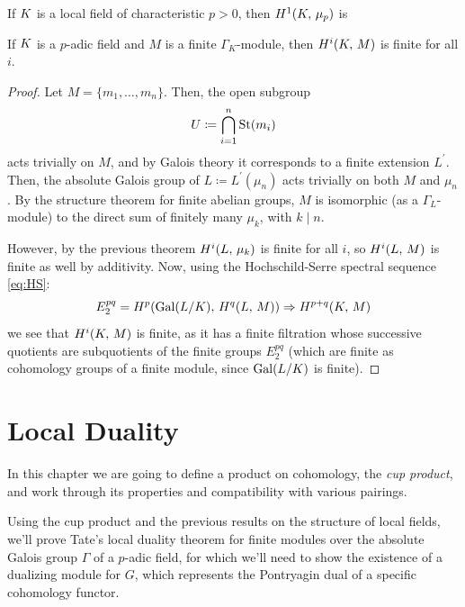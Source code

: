\documentclass[a4paper, oneside]{memoir}
\begin{document}
\begin{remark}\label{rm:H1CharP}
    If $K$ is a local field of characteristic $p>0$, then $H^{1}( K, \, \mu_p )$ is
\end{remark}

\begin{corollary}\label{cor:FinCohom}
    If $K$ is a $p$-adic field and $M$ is a finite $\Gamma_K$-module, then
    \(H^{i}( K, \, M )\) is finite for all $i$.
\end{corollary}
\begin{proof}
    Let $M=\{m_1,\ldots,m_n\}$. Then, the open subgroup
    \[
        U\coloneqq \bigcap_{i=1}^n{\operatorname{\mathrm{St}}(m_i)}
    \]
    acts trivially on $M$, and by Galois theory it corresponds to a finite extension $L^{\prime} $. Then, the absolute Galois group of $L\coloneqq L^{\prime}(\mu_n)$ acts trivially on both $M$ and $\mu_n$. By the structure theorem for finite abelian groups, $M$ is isomorphic (as a $\Gamma_L$-module) to the direct sum of finitely many $\mu_k$, with $k\mid n$.

    However, by the previous theorem $H^{i}( L, \, \mu_k )$ is finite for all $i$, so $H^{i}( L, \, M )$ is finite as well by additivity. Now, using the Hochschild-Serre spectral sequence \eqref{eq:HS}:
    \[
        E_2^{pq}= H^{p}( \mathrm{Gal}{(L / K)}, \, H^{q}( L, \, M ) ) \Rightarrow H^{p+q}( K, \, M )
    \]
    we see that $H^{i}( K, \, M )$ is finite, as it has a finite filtration whose successive quotients are subquotients of the finite groups $E_2^{pq}$ (which are finite as cohomology groups of a finite module, since $\mathrm{Gal}(L /K)$ is finite).
\end{proof}




\chapter{Local Duality}
In this chapter we are going to define a product on cohomology, the \textit{cup product}, and work through its properties and compatibility with various pairings.

Using the cup product and the previous results on the structure of local fields, we'll prove Tate's local duality theorem for finite modules over the absolute Galois group $\Gamma$ of a $p$-adic field, for which we'll need to show the existence of a dualizing module for $G$, which represents the Pontryagin dual of a specific cohomology functor.
\end{document}

